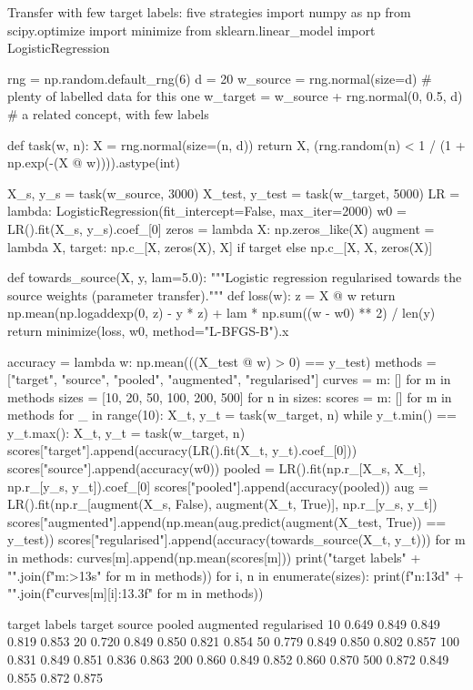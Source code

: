\begin{pylisting}[label={lst:transferlearning}]{Transfer with few target labels: five strategies}
import numpy as np
from scipy.optimize import minimize
from sklearn.linear_model import LogisticRegression

rng = np.random.default_rng(6)
d = 20
w_source = rng.normal(size=d)                       # plenty of labelled data for this one
w_target = w_source + rng.normal(0, 0.5, d)         # a related concept, with few labels

def task(w, n):
    X = rng.normal(size=(n, d))
    return X, (rng.random(n) < 1 / (1 + np.exp(-(X @ w)))).astype(int)

X_s, y_s = task(w_source, 3000)
X_test, y_test = task(w_target, 5000)
LR = lambda: LogisticRegression(fit_intercept=False, max_iter=2000)
w0 = LR().fit(X_s, y_s).coef_[0]
zeros = lambda X: np.zeros_like(X)
augment = lambda X, target: np.c_[X, zeros(X), X] if target else np.c_[X, X, zeros(X)]

def towards_source(X, y, lam=5.0):
    """Logistic regression regularised towards the source weights (parameter transfer)."""
    def loss(w):
        z = X @ w
        return np.mean(np.logaddexp(0, z) - y * z) + lam * np.sum((w - w0) ** 2) / len(y)
    return minimize(loss, w0, method="L-BFGS-B").x

accuracy = lambda w: np.mean(((X_test @ w) > 0) == y_test)
methods = ["target", "source", "pooled", "augmented", "regularised"]
curves = {m: [] for m in methods}
sizes = [10, 20, 50, 100, 200, 500]
for n in sizes:
    scores = {m: [] for m in methods}
    for _ in range(10):
        X_t, y_t = task(w_target, n)
        while y_t.min() == y_t.max():
            X_t, y_t = task(w_target, n)
        scores["target"].append(accuracy(LR().fit(X_t, y_t).coef_[0]))
        scores["source"].append(accuracy(w0))
        pooled = LR().fit(np.r_[X_s, X_t], np.r_[y_s, y_t]).coef_[0]
        scores["pooled"].append(accuracy(pooled))
        aug = LR().fit(np.r_[augment(X_s, False), augment(X_t, True)], np.r_[y_s, y_t])
        scores["augmented"].append(np.mean(aug.predict(augment(X_test, True)) == y_test))
        scores["regularised"].append(accuracy(towards_source(X_t, y_t)))
    for m in methods:
        curves[m].append(np.mean(scores[m]))
print("target labels" + "".join(f"{m:>13s}" for m in methods))
for i, n in enumerate(sizes):
    print(f"{n:13d}" + "".join(f"{curves[m][i]:13.3f}" for m in methods))
\end{pylisting}
\begin{pyoutput}
target labels       target       source       pooled    augmented  regularised
           10        0.649        0.849        0.849        0.819        0.853
           20        0.720        0.849        0.850        0.821        0.854
           50        0.779        0.849        0.850        0.802        0.857
          100        0.831        0.849        0.851        0.836        0.863
          200        0.860        0.849        0.852        0.860        0.870
          500        0.872        0.849        0.855        0.872        0.875
\end{pyoutput}

